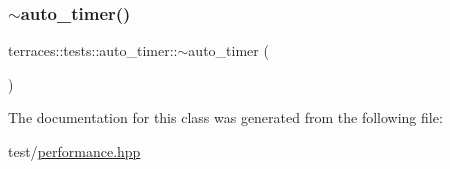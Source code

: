 \subsubsection{\texorpdfstring{$\sim$auto\+\_\+timer()}{~auto\_timer()}}
{\footnotesize\ttfamily terraces\+::tests\+::auto\+\_\+timer\+::$\sim$auto\+\_\+timer (\begin{DoxyParamCaption}{ }\end{DoxyParamCaption})\hspace{0.3cm}{\ttfamily [inline]}}



The documentation for this class was generated from the following file\+:\begin{DoxyCompactItemize}
\item 
test/\hyperlink{performance_8hpp}{performance.\+hpp}\end{DoxyCompactItemize}
